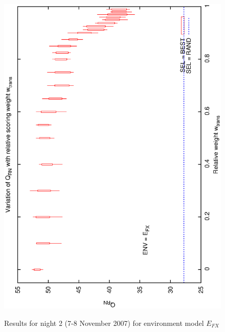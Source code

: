 \begin{figure}[h]
\begin{center}
{    \includegraphics[scale=0.25, angle=-90]{figures/cs1_dw2_rn.eps}
  }
\caption{Results for night 2 (7-8 November 2007) for environment model $E_{FX}$} 
 \end{center}
\end{figure}
 

